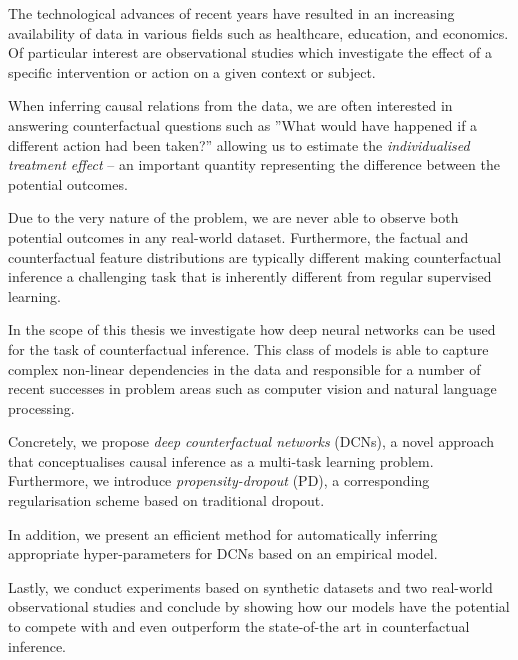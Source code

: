The technological advances of recent years have resulted in an increasing availability of data in various fields such as healthcare, education, and economics. Of particular interest are observational studies which investigate the effect of a specific intervention or action on a given context or subject. 

When inferring causal relations from the data, we are often interested in answering counterfactual questions such as ”What would have happened if a different action had been taken?” allowing us to estimate the \emph{individualised treatment effect} -- an important quantity representing the difference between the potential outcomes.

Due to the very nature of the problem, we are never able to observe both potential outcomes in any real-world dataset. Furthermore, the factual and counterfactual feature distributions are typically different making counterfactual inference a challenging task that is inherently different from regular supervised learning. 

In the scope of this thesis we investigate how deep neural networks can be used for the task of counterfactual inference. This class of models is able to capture complex non-linear dependencies in the data and responsible for a number of recent successes in problem areas such as computer vision and natural language processing. 

Concretely, we propose \emph{deep counterfactual networks} (DCNs), a novel approach that conceptualises causal inference as a multi-task learning problem. Furthermore, we introduce \emph{propensity-dropout} (PD), a corresponding regularisation scheme based on traditional dropout.

In addition, we present an efficient method for automatically inferring appropriate hyper-parameters for DCNs based on an empirical model.

Lastly, we conduct experiments based on synthetic datasets and two real-world observational studies and conclude by showing how our models have the potential to compete with and even outperform the state-of-the art in counterfactual inference. 


